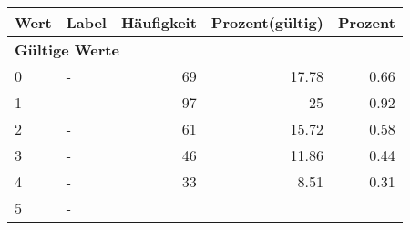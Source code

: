      \begin{longtable}{lXrrr}
     \toprule
     \textbf{Wert} & \textbf{Label} & \textbf{Häufigkeit} & \textbf{Prozent(gültig)} & \textbf{Prozent} \\
     \endhead
     \midrule
     \multicolumn{5}{l}{\textbf{Gültige Werte}}\\

     0 &
     \multicolumn{1}{X}{ -  } &


       \num{69} &
       \num[round-mode=places,round-precision=2]{17.78} &
         \num[round-mode=places,round-precision=2]{0.66} \\

     1 &
     \multicolumn{1}{X}{ -  } &


       \num{97} &
       \num[round-mode=places,round-precision=2]{25} &
         \num[round-mode=places,round-precision=2]{0.92} \\

     2 &
     \multicolumn{1}{X}{ -  } &


       \num{61} &
       \num[round-mode=places,round-precision=2]{15.72} &
         \num[round-mode=places,round-precision=2]{0.58} \\

     3 &
     \multicolumn{1}{X}{ -  } &


       \num{46} &
       \num[round-mode=places,round-precision=2]{11.86} &
         \num[round-mode=places,round-precision=2]{0.44} \\

     4 &
     \multicolumn{1}{X}{ -  } &


       \num{33} &
       \num[round-mode=places,round-precision=2]{8.51} &
         \num[round-mode=places,round-precision=2]{0.31} \\

     5 &
     \multicolumn{1}{X}{ -  } &



\end{longtable}
